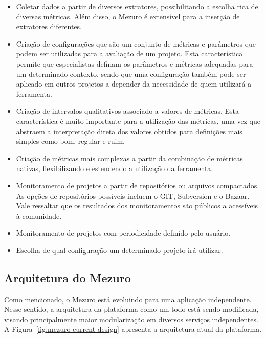 \begin{itemize}
\item Coletar dados a partir de diversos extratores, possibilitando a escolha  rica de diversas métricas. Além disso, o Mezuro é extensível para a inserção de extratores diferentes.

\item Criação de configurações que são um conjunto de métricas e parâmetros que podem ser utilizadas para a avaliação de um projeto. Esta característica permite que especialistas definam os parâmetros e métricas adequadas para um determinado contexto, sendo que uma configuração também pode ser aplicado em outros projetos a depender da necessidade de quem utilizará a ferramenta.

\item Criação de intervalos qualitativos associado a valores de métricas. Esta característica é muito importante para a utilização das métricas, uma vez que abstraem a interpretação direta dos valores obtidos para definições mais simples como bom, regular e ruim.

\item Criação de métricas mais complexas a partir da combinação de métricas nativas, flexibilizando e estendendo a utilização da ferramenta.

\item Monitoramento de projetos a partir de repositórios ou arquivos compactados. As opções de repositórios possíveis incluem o GIT, Subversion e o Bazaar. Vale ressaltar que os resultados dos monitoramentos são públicos a acessíveis à comunidade.

\item Monitoramento de projetos com periodicidade definido pelo usuário.

\item Escolha de qual configuração um determinado projeto irá utilizar.
\end{itemize}

%

\subsection{Arquitetura do Mezuro}
\label{sec-mezuro-design}

Como mencionado, o Mezuro está evoluindo para uma aplicação independente. Nesse sentido, a arquitetura da plataforma como um todo está sendo modificada, visando principalmente maior modularização em diversos serviços independentes. A Figura~\ref{fig:mezuro-current-design} apresenta a arquitetura atual da plataforma.

